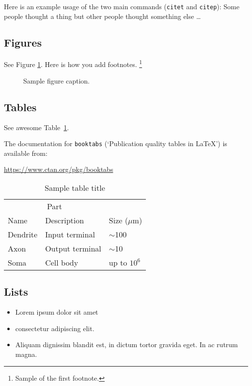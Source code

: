 \documentclass{article}
\begin{document}
	Here is an example usage of the two main commands (\verb+citet+ and \verb+citep+): Some people thought a thing \citet{doe2015} but other people thought something else \citep{a2016}\dots
	
	\subsection{Figures}
	\lipsum[10]
	See Figure \ref{fig:fig1}. Here is how you add footnotes. \footnote{Sample of the first footnote.}
	\lipsum[11]
	
	\begin{figure}
		\centering
		\fbox{\rule[-.5cm]{4cm}{4cm} \rule[-.5cm]{4cm}{0cm}}
		\caption{Sample figure caption.}
		\label{fig:fig1}
	\end{figure}
	
	\subsection{Tables}
	See awesome Table~\ref{tab:table}.
	
	The documentation for \verb+booktabs+ (`Publication quality tables in LaTeX') is available from:
	\begin{center}
		\url{https://www.ctan.org/pkg/booktabs}
	\end{center}
	
	
	\begin{table}
		\caption{Sample table title}
		\centering
		\begin{tabular}{lll}
			\toprule
			\multicolumn{2}{c}{Part}                   \\
			\cmidrule(r){1-2}
			Name     & Description     & Size ($\mu$m) \\
			\midrule
			Dendrite & Input terminal  & $\sim$100     \\
			Axon     & Output terminal & $\sim$10      \\
			Soma     & Cell body       & up to $10^6$  \\
			\bottomrule
		\end{tabular}
		\label{tab:table}
	\end{table}
	
	\subsection{Lists}
	\begin{itemize}
		\item Lorem ipsum dolor sit amet
		\item consectetur adipiscing elit.
		\item Aliquam dignissim blandit est, in dictum tortor gravida eget. In ac rutrum magna.
	\end{itemize}
	
\end{document}
